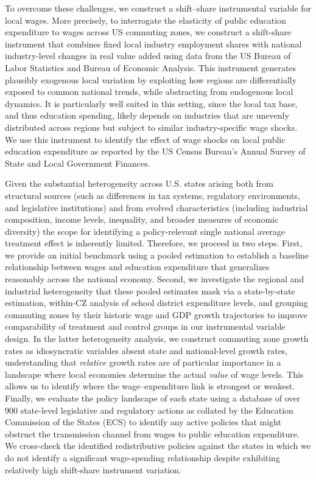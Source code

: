 \documentclass[
  10pt,
]{article}
\begin{document}
To overcome these challenges, we construct a shift--share instrumental
variable for local wages. More precisely, to interrogate the elasticity
of public education expenditure to wages across US commuting zones, we
construct a shift-share instrument that combines fixed local industry
employment shares with national industry-level changes in real value
added using data from the US Bureau of Labor Statistics and Bureau of
Economic Analysis. This instrument generates plausibly exogenous local
variation by exploiting how regions are differentially exposed to common
national trends, while abstracting from endogenous local dynamics. It is
particularly well suited in this setting, since the local tax base, and
thus education spending, likely depends on industries that are unevenly
distributed across regions but subject to similar industry-specific wage
shocks. We use this instrument to identify the effect of wage shocks on
local public education expenditure as reported by the US Census Bureau's
Annual Survey of State and Local Government Finances.

Given the substantial heterogeneity across U.S. states arising both from
structural sources (such as differences in tax systems, regulatory
environments, and legislative institutions) and from evolved
characteristics (including industrial composition, income levels,
inequality, and broader measures of economic diversity) the scope for
identifying a policy-relevant single national average treatment effect
is inherently limited. Therefore, we proceed in two steps. First, we
provide an initial benchmark using a pooled estimation to establish a
baseline relationship between wages and education expenditure that
generalizes reasonably across the national economy. Second, we
investigate the regional and industrial heterogeneity that these pooled
estimates mask via a state-by-state estimation, within-CZ analysis of
school district expenditure levels, and grouping commuting zones by
their historic wage and GDP growth trajectories to improve comparability
of treatment and control groups in our instrumental variable design. In
the latter heterogeneity analysis, we construct commuting zone growth
rates as idiosyncratic variables absent state and national-level growth
rates, understanding that \emph{relative} growth rates are of particular
importance in a landscape where local economies determine the actual
\emph{value} of wage levels. This allows us to identify where the
wage--expenditure link is strongest or weakest. Finally, we evaluate the
policy landscape of each state using a database of over 900 state-level
legislative and regulatory actions as collated by the Education
Commission of the States (ECS) to identify any active policies that
might obstruct the transmission channel from wages to public education
expenditure. We cross-check the identified redistributive policies
against the states in which we do not identify a significant
wage-spending relationship despite exhibiting relatively high
shift-share instrument variation.
\end{document}
